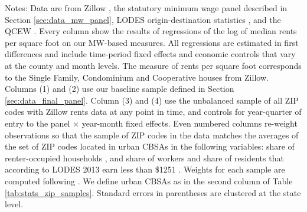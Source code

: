 \begin{landscape}
\begin{table}[hbt!]
    \begin{minipage}{.95\linewidth} \footnotesize
        \vspace{2mm}
        Notes:
        Data are from Zillow \parencite{ZillowData}, 
        the statutory minimum wage panel described in Section \ref{sec:data_mw_panel}, 
        LODES origin-destination statistics \parencite{CensusLODES},
        and the QCEW \parencite{QCEW}.
        Every column show the results of regressions of the log of 
        median rents per square foot on our MW-based measures.
        All regressions are estimated in first differences and include 
        time-period fixed effects and economic controls that vary at the 
        county and month levels.
        The measure of rents per square foot corresponds to the Single Family, 
        Condominium and Cooperative houses from Zillow.
        Columns (1) and (2) use our baseline sample defined in Section 
        \ref{sec:data_final_panel}.
        Column (3) and (4) use the unbalanced sample of all ZIP codes with 
        Zillow rents data at any point in time, and controls for year-quarter of 
        entry to the panel $\times$ year-month fixed effects.
        Even numbered columns re-weight observations so that the sample of 
        ZIP codes in the data matches the averages of the set of ZIP codes
        located in urban CBSAs in the following variables:
        share of renter-occupied households \parencite{CensusDecennial}, and share of 
        workers and share of residents that according to LODES 2013 earn less than 
        \$1251 \parencite{CensusLODES}.
        Weights for each sample are computed following \textcite{Hainmueller2012}.
        We define urban CBSAs as in the second column of Table 
        \ref{tab:stats_zip_samples}.
        Standard errors in parentheses are clustered at the state level.
    \end{minipage}
\end{table}
\end{landscape}
